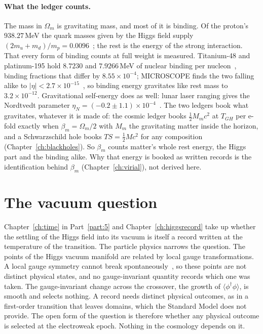 \paragraph{What the ledger counts.}\label{ch:ew:binding} The mass in $\Omega_m$ is gravitating mass, and most of it is binding. Of the proton's $938.27$\,MeV the
quark masses given by the Higgs field supply $(2m_u+m_d)/m_p=0.0096$~\cite{PDG2024}; the rest is the energy of the strong interaction. That every
form of binding counts at full weight is measured. Titanium-48 and platinum-195 hold $8.7230$ and $7.9266$\,MeV of nuclear binding per
nucleon~\cite{AME2020}, binding fractions that differ by $8.55\times10^{-4}$; MICROSCOPE finds the two falling alike to
$|\eta|<2.7\times10^{-15}$~\cite{Touboul2022}, so binding energy gravitates like rest mass to $3.2\times10^{-12}$. Gravitational self-energy
does as well: lunar laser ranging gives the Nordtvedt parameter $\eta_N=(-0.2\pm1.1)\times10^{-4}$~\cite{Hofmann2018}. \measured{} The two
ledgers book what gravitates, whatever it is made of: the cosmic ledger books $\tfrac12M_mc^2$ at $T_{GH}$ per e-fold exactly when
$\beta_m=\Omega_m/2$ with $M_m$ the gravitating matter inside the horizon, and a Schwarzschild hole books $TS=\tfrac12Mc^2$ for any
composition (Chapter~\ref{ch:blackholes}). So $\beta_m$ counts matter's whole rest energy, the Higgs part and the binding alike. \derived{}
Why that energy is booked as written records is the identification behind $\beta_m$ (Chapter~\ref{ch:virial}), not derived here. \openprob

\section{The vacuum question}\label{sec:ew:vacuum}
Chapter~\ref{ch:time} in Part~\ref{part:5} and Chapter~\ref{ch:higgsrecord} take up whether the settling of the Higgs field into its vacuum is itself a record written at
the temperature of the transition. The particle physics narrows the question. The points of the Higgs vacuum manifold are related by local gauge
transformations. A local gauge symmetry cannot break spontaneously~\cite{Elitzur1975}, so these points are not distinct physical states, and no
gauge-invariant quantity records which one was taken. The gauge-invariant change across the crossover, the growth of $\langle\phi^\dagger\phi\rangle$,
is smooth and selects nothing. A record needs distinct physical outcomes, as in a first-order transition that leaves domains, which the Standard Model
does not provide. The open form of the question is therefore whether any physical outcome is selected at the electroweak epoch. Nothing in the
cosmology depends on it. \openprob

